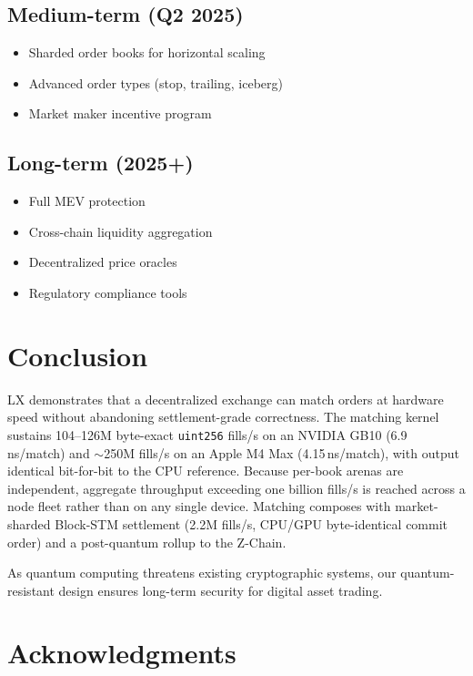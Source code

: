 \documentclass[11pt,a4paper]{article}
\newcommand{\lxdex}{\textsc{LX}}
\begin{document}
\subsection{Medium-term (Q2 2025)}
\begin{itemize}
    \item Sharded order books for horizontal scaling
    \item Advanced order types (stop, trailing, iceberg)
    \item Market maker incentive program
\end{itemize}

\subsection{Long-term (2025+)}
\begin{itemize}
    \item Full MEV protection
    \item Cross-chain liquidity aggregation
    \item Decentralized price oracles
    \item Regulatory compliance tools
\end{itemize}

\section{Conclusion}

\lxdex{} demonstrates that a decentralized exchange can match orders at
hardware speed without abandoning settlement-grade correctness. The matching
kernel sustains 104--126M byte-exact \texttt{uint256} fills/s on an NVIDIA GB10
(6.9\,ns/match) and $\sim$250M fills/s on an Apple M4 Max (4.15\,ns/match), with
output identical bit-for-bit to the CPU reference. Because per-book arenas are
independent, aggregate throughput exceeding one billion fills/s is reached
across a node fleet rather than on any single device. Matching composes with
market-sharded Block-STM settlement (2.2M fills/s, CPU/GPU byte-identical commit
order) and a post-quantum rollup to the Z-Chain.

As quantum computing threatens existing cryptographic systems, our
quantum-resistant design ensures long-term security for digital asset trading.

\section*{Acknowledgments}
\end{document}
